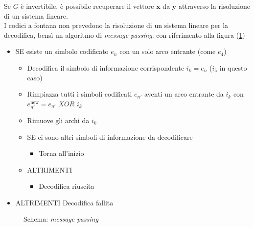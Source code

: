 \documentclass[italian, a4paper, 12pt]{article}
\begin{document}
Se $G$ è invertibile, è possibile recuperare il vettore $\bm{x}$ da $\bm{y}$ attraverso la risoluzione di un sistema lineare.\\
I codici a fontana non prevedono la risoluzione di un sistema lineare per la decodifica, bensì un algoritmo di \textit{message passing}: con riferimento alla figura (\ref{fig:FC})
\begin{itemize}
        \item SE esiste un simbolo codificato $e_n$ con un solo arco entrante (come $e_4$)\begin{itemize}
                \item	Decodifica il simbolo di informazione corrispondente $i_k=e_n$ ($i_5$ in questo caso)
                \item	Rimpiazza tutti i simboli codificati $e_{n'}$ aventi un arco entrante da $i_k$ con $e_{n'}^{\text{new}} = e_{n'} \textit{ XOR } i_k$
                \item   Rimuove gli archi da $i_k$
                \item   SE ci sono altri simboli di informazione da decodificare \begin{itemize}
                        \item Torna all'inizio
                \end{itemize}
                \item ALTRIMENTI\begin{itemize}
                        \item Decodifica riuscita
                \end{itemize}
        \end{itemize}

        \item ALTRIMENTI Decodifica fallita
\end{itemize}
\begin{figure}[H]
    \centering
    \caption{Schema: \textit{message passing}}
    \label{fig:FC}
\end{figure}
\newpage
\end{document}
